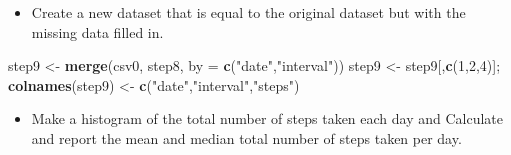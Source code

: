 \documentclass[
]{article}
\newenvironment{Shaded}{\begin{snugshade}}{\end{snugshade}}
\newcommand{\CommentTok}[1]{\textcolor[rgb]{0.56,0.35,0.01}{\textit{#1}}}
\newcommand{\DataTypeTok}[1]{\textcolor[rgb]{0.13,0.29,0.53}{#1}}
\newcommand{\DecValTok}[1]{\textcolor[rgb]{0.00,0.00,0.81}{#1}}
\newcommand{\KeywordTok}[1]{\textcolor[rgb]{0.13,0.29,0.53}{\textbf{#1}}}
\newcommand{\NormalTok}[1]{#1}
\newcommand{\OperatorTok}[1]{\textcolor[rgb]{0.81,0.36,0.00}{\textbf{#1}}}
\newcommand{\StringTok}[1]{\textcolor[rgb]{0.31,0.60,0.02}{#1}}
\providecommand{\tightlist}{%
  \setlength{\itemsep}{0pt}\setlength{\parskip}{0pt}}
\begin{document}
\begin{Shaded}
\end{Shaded}

\begin{itemize}
\tightlist
\item
  Create a new dataset that is equal to the original dataset but with
  the missing data filled in.
\end{itemize}

\begin{Shaded}
\begin{Highlighting}[]
\NormalTok{step9 <-}\StringTok{ }\KeywordTok{merge}\NormalTok{(csv0, step8, }\DataTypeTok{by =} \KeywordTok{c}\NormalTok{(}\StringTok{"date"}\NormalTok{,}\StringTok{"interval"}\NormalTok{))}
\NormalTok{step9 <-}\StringTok{ }\NormalTok{step9[,}\KeywordTok{c}\NormalTok{(}\DecValTok{1}\NormalTok{,}\DecValTok{2}\NormalTok{,}\DecValTok{4}\NormalTok{)]; }
\KeywordTok{colnames}\NormalTok{(step9) <-}\StringTok{ }\KeywordTok{c}\NormalTok{(}\StringTok{"date"}\NormalTok{,}\StringTok{"interval"}\NormalTok{,}\StringTok{"steps"}\NormalTok{)}
\end{Highlighting}
\end{Shaded}

\begin{itemize}
\tightlist
\item
  Make a histogram of the total number of steps taken each day and
  Calculate and report the mean and median total number of steps taken
  per day.
\end{itemize}
\end{document}
